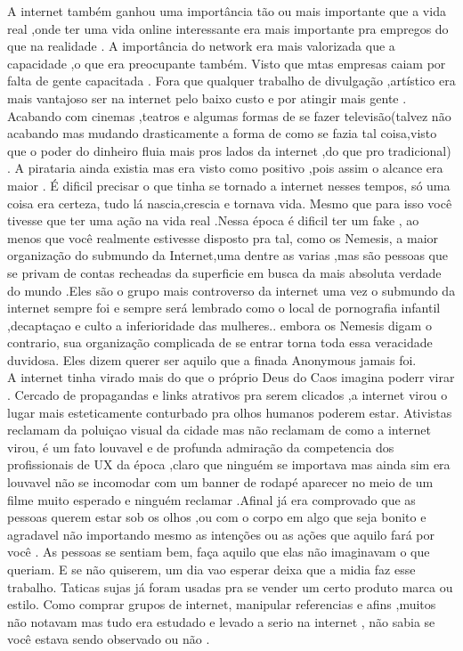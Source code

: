 \documentclass{book}
\begin{document}
A internet também ganhou uma importância tão ou mais importante que a vida real ,onde ter uma vida online interessante era mais importante pra empregos do que na realidade . A importância do network era mais valorizada que a capacidade ,o que era preocupante também. Visto que mtas empresas caiam por falta de gente capacitada . Fora que qualquer trabalho de divulgação ,artístico era mais vantajoso ser na internet pelo baixo custo e por atingir mais gente . Acabando com cinemas ,teatros e algumas formas de se fazer televisão(talvez não acabando mas mudando  drasticamente a forma de como se fazia tal coisa,visto que o poder do dinheiro fluia mais pros lados da internet ,do que pro tradicional) . A pirataria ainda existia mas era visto como positivo ,pois assim o alcance era maior . É dificil precisar o que tinha se tornado a internet nesses tempos, só uma coisa era certeza, tudo lá nascia,crescia e tornava vida. Mesmo que para isso você tivesse que ter uma ação na vida real .Nessa época é dificil ter um fake , ao menos que você realmente estivesse disposto pra tal, como os Nemesis, a maior organização do submundo da Internet,uma dentre as varias ,mas são pessoas que se privam de contas recheadas da superficie em busca da mais absoluta verdade do mundo .Eles são o grupo mais controverso da internet uma vez o submundo da internet sempre foi e sempre será lembrado como o local de pornografia infantil ,decaptaçao e culto a inferioridade das mulheres.. embora os Nemesis digam o contrario, sua organização complicada de se entrar torna toda essa veracidade duvidosa. Eles dizem querer ser aquilo que a finada Anonymous jamais foi.\\
A internet tinha  virado mais do que o próprio Deus do Caos imagina poderr virar . Cercado de propagandas e links atrativos pra serem clicados ,a internet virou o lugar mais esteticamente conturbado pra olhos humanos poderem estar. Ativistas reclamam da poluiçao visual da cidade mas não reclamam de como a internet virou, é um fato louvavel e de profunda admiração da competencia dos profissionais de UX da época ,claro que ninguém se importava mas ainda sim era louvavel não se incomodar com um banner de rodapé aparecer no meio de um filme muito esperado e ninguém reclamar .Afinal já era comprovado que as pessoas querem estar sob os olhos ,ou com o corpo em algo que seja bonito e agradavel não importando mesmo as intenções ou as ações que aquilo  fará por você . As pessoas se sentiam bem, faça aquilo que elas não imaginavam o que queriam. E se não quiserem, um dia vao esperar deixa que a midia faz esse trabalho. Taticas sujas já foram usadas pra se vender um certo produto marca ou estilo. Como comprar grupos de internet,  manipular referencias e afins ,muitos não notavam  mas tudo era estudado e levado a serio na internet , não sabia se você estava sendo observado ou não .\\
\end{document}
